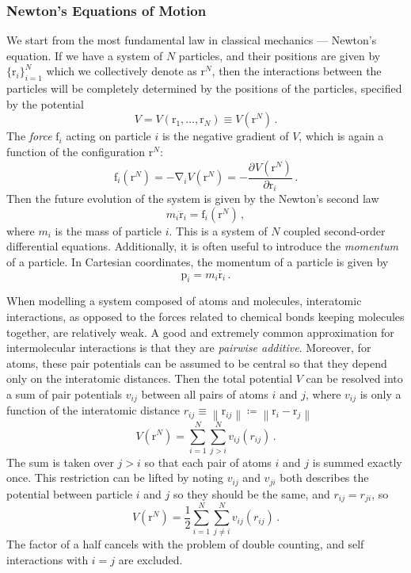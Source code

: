 \documentclass{article}
\theoremstyle{plain}\theoremheaderfont{\normalfont\itshape}\theorembodyfont{\rmfamily}\theoremseparator{.}\newtheorem*{rem}{Remark}\newtheorem*{ex}{Example}\newtheorem*{proof}{Proof}\newtheorem*{altp}{Alternative proof}
\theoremstyle{plain}\theoremheaderfont{\normalfont\bfseries}\theorembodyfont{\rmfamily}\theoremseparator{.}\newtheorem{thm}{Theorem}[section]\newtheorem{lem}[thm]{Lemma}\newtheorem{prop}[thm]{Proposition}\newtheorem*{cor}{Corollary}\newtheorem{defn}[thm]{Definition}\newtheorem{clm}[thm]{Claim}\newtheorem{clminproof}{Claim}\newtheorem{alg}[thm]{Algorithm}\newtheorem{hyp}[thm]{Hypothesis}\newtheorem{law}[thm]{Law}
\theoremstyle{break}\theoremheaderfont{\normalfont\itshape}\theorembodyfont{\rmfamily}\theoremseparator{.\medskip}\newtheorem*{proofskip}{Proof}\newtheorem*{exs}{Examples}\newtheorem*{rems}{Remarks}
\theoremstyle{break}\theoremheaderfont{\normalfont\bfseries}\theorembodyfont{\rmfamily}\theoremseparator{.\medskip}\newtheorem{lemskip}[thm]{Lemma}\newtheorem{defnskip}[thm]{Definition}\newtheorem{propskip}[thm]{Proposition}\newtheorem{thmskip}[thm]{Theorem}
\numberwithin{equation}{section}
\newcommand{\pdv}[3][]{\frac{\partial^{#1} #2}{{\partial #3}^{#1}}}
\newcommand{\vb}[1]{\bm{\mathrm{#1}}}
\newcommand{\norm}[1]{\left\| #1 \right\|}
\newcommand{\grad}{\vb{\nabla}}
\begin{document}
    \subsubsection{Newton's Equations of Motion}
    We start from the most fundamental law in classical mechanics --- Newton's equation. If we have a system of \(N\) particles, and their positions are given by \(\{\vb{r}_i\}_{i=1}^{N}\) which we collectively denote as \(\vb{r}^N\), then the interactions between the particles will be completely determined by the positions of the particles, specified by the potential
    \begin{equation}
        V=V(\vb{r}_1,\dots,\vb{r}_N)\equiv V(\vb{r}^N)\,.
    \end{equation}
    The \textit{force} \(\vb{f}_i\) acting on particle \(i\) is the negative gradient of \(V\), which is again a function of the configuration \(\vb{r}^N\):
    \begin{equation}
        \vb{f}_i(\vb{r}^N)=-\grad_i V(\vb{r}^N)=-\pdv{V(\vb{r}^N)}{\vb{r}_i}\,.
    \end{equation}
    Then the future evolution of the system is given by the Newton's second law
    \begin{equation}
        m_i\ddot{\vb{r}}_i=\vb{f}_i(\vb{r}^N)\,,
    \end{equation}
    where \(m_i\) is the mass of particle \(i\). This is a system of \(N\) coupled second-order differential equations. Additionally, it is often useful to introduce the \textit{momentum} of a particle. In Cartesian coordinates, the momentum of a particle is given by
    \begin{equation}
        \vb{p}_i=m_i\dot{\vb{r}_i}\,.
    \end{equation}

    When modelling a system composed of atoms and molecules, interatomic interactions, as opposed to the forces related to chemical bonds keeping molecules together, are relatively weak. A good and extremely common approximation for intermolecular interactions is that they are \textit{pairwise additive}. Moreover, for atoms, these pair potentials can be assumed to be central so that they depend only on the interatomic distances. Then the total potential \(V\) can be resolved into a sum of pair potentials \(v_{ij}\) between all pairs of atoms \(i\) and \(j\), where \(v_{ij}\) is only a function of the interatomic distance \(r_{ij}\equiv\norm{\vb{r}_{ij}}\coloneqq\norm{\vb{r}_i-\vb{r}_j}\)
    \begin{equation}
        V(\vb{r}^N)=\sum_{i=1}^{N}\sum_{j>i}^{N}v_{ij}(r_{ij})\,.
    \end{equation}
    The sum is taken over \(j>i\) so that each pair of atoms \(i\) and \(j\) is summed exactly once. This restriction can be lifted by noting \(v_{ij}\) and \(v_{ji}\) both describes the potential between particle \(i\) and \(j\) so they should be the same, and \(r_{ij}=r_{ji}\), so
    \begin{equation}\label{pairwise_potential}
        V(\vb{r}^N)=\frac{1}{2}\sum_{i=1}^{N}\sum_{j\ne i}^{N}v_{ij}(r_{ij})\,.
    \end{equation}
    The factor of a half cancels with the problem of double counting, and self interactions with \(i=j\) are excluded.
\end{document}
